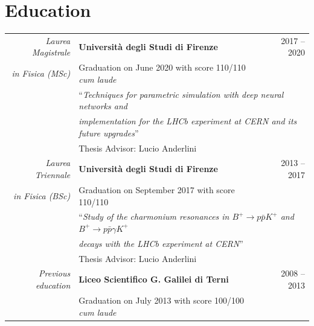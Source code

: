 \documentclass[a4, 11pt]{report}
\begin{document}
    \section*{Education}
        \begin{tabular*}{\textwidth}{rl @{\extracolsep{\fill}} r}
            \textit{Laurea Magistrale}  
            & {\textbf {Università degli Studi di Firenze}}
            & {\small 2017 -- 2020}\\
            \textit{in Fisica (MSc)}
            & {\small Graduation on June 2020 with score 110/110 \textit{cum laude}}\\ [1.5mm]
            & \multicolumn{2}{l}{``\textit{Techniques for parametric simulation with deep neural networks and}}\\
            & \multicolumn{2}{l}{\textit{implementation for the LHCb experiment at CERN and its future upgrades}''}\\
            & {\small Thesis Advisor: Lucio Anderlini}\\ [3mm]
            
            \textit{Laurea Triennale}   
            & {\textbf {Università degli Studi di Firenze}}
            & {\small 2013 -- 2017}\\
            \textit{in Fisica (BSc)}    
            & {\small Graduation on September 2017 with score 110/110}\\ [1.5mm]
            & \multicolumn{2}{l}{``\textit{Study of the charmonium resonances in $B^+ \to p \bar{p} K^+$ and $B^+ \to p \bar{p} \gamma K^+$}}\\
            & \multicolumn{2}{l}{\textit{ decays with the LHCb experiment at CERN}''}\\
            & {\small Thesis Advisor: Lucio Anderlini}\\ [3mm]
                                        
            \textit{Previous education} 
            & {\textbf {Liceo Scientifico G. Galilei di Terni}}
            & {\small 2008 -- 2013}\\
            & {\small Graduation on July 2013 with score 100/100 \textit{cum laude}}
        \end{tabular*}
        
    \pagebreak
\end{document}

